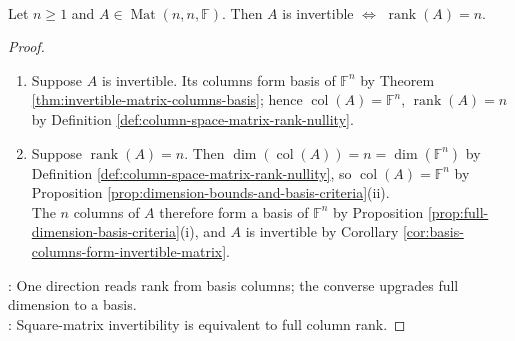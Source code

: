 \begin{corollary} \label{cor:square-matrix-invertible-iff-full-rank} \\
Let $n\geq1$ and $A\in\operatorname{Mat}(n,n,\mathbb{F})$. Then $A$ is invertible $\Longleftrightarrow$ $\operatorname{rank}(A)=n$.
\begin{proof}
\begin{enumerate}[label=\roman*.]
\setlength{\itemsep}{0pt}
\item[$(\Rightarrow)$] Suppose $A$ is invertible. Its columns form basis of $\mathbb{F}^n$ by Theorem \ref{thm:invertible-matrix-columns-basis}; hence $\operatorname{col}(A)=\mathbb{F}^n$, $\operatorname{rank}(A)=n$ by Definition \ref{def:column-space-matrix-rank-nullity}.
\item[$(\Leftarrow)$] Suppose $\operatorname{rank}(A)=n$. Then $\dim(\operatorname{col}(A))=n=\dim(\mathbb{F}^n)$ by Definition \ref{def:column-space-matrix-rank-nullity}, so $\operatorname{col}(A)=\mathbb{F}^n$ by Proposition \ref{prop:dimension-bounds-and-basis-criteria}(ii).\\
The $n$ columns of $A$ therefore form a basis of $\mathbb{F}^n$ by Proposition \ref{prop:full-dimension-basis-criteria}(i), and $A$ is invertible by Corollary \ref{cor:basis-columns-form-invertible-matrix}.
\end{enumerate}
: One direction reads rank from basis columns; the converse upgrades full dimension to a basis.\\
: Square-matrix invertibility is equivalent to full column rank.
\end{proof}
\end{corollary}

